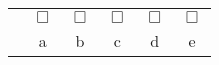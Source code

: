 \begin{center}
\begin{tabular}{c c c c c c}
& $\Box$\hspace{-0.27cm}  & $\Box$  & $\Box$   & $\Box$   & $\Box$  \\
& a & b  & c  & d  & e \\
\end{tabular}
\end{center}
